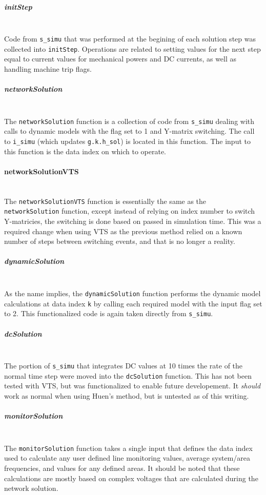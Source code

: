 \documentclass[12pt]{article}
\begin{document}
\subparagraph{initStep} \ \\
Code from \verb|s_simu| that was performed at the begining of each solution step was collected into \verb|initStep|.
Operations are related to setting values for the next step equal to current values for mechanical powers and DC currents, as well as handling machine trip flags.


\subparagraph{networkSolution} \ \\
The \verb|networkSolution| function is a collection of code from \verb|s_simu| dealing with calls to dynamic models with the flag set to 1 and Y-matrix switching.
The call to \verb|i_simu| (which updates \verb|g.k.h_sol|) is located in this function.
The input to this function is the data index on which to operate.

\paragraph{networkSolutionVTS} \ \\
The \verb|networkSolutionVTS| function is essentially the same as the \verb|networkSolution| function, except instead of relying on index number to switch Y-matricies, the switching is done based on passed in simulation time.
This was a required change when using VTS as the previous method relied on a known number of steps between switching events, and that is no longer a reality.


\subparagraph{dynamicSolution} \ \\
As the name implies, the \verb|dynamicSolution| function performs the dynamic model calculations at data index \verb|k| by calling each required model with the input flag set to 2.
This functionalized code is again taken directly from \verb|s_simu|.


\subparagraph{dcSolution} \ \\
The portion of \verb|s_simu| that integrates DC values at 10 times the rate of the normal time step were moved into the \verb|dcSolution| function.
This has not been tested with VTS, but was functionalized to enable future developement.
It \emph{should} work as normal when using Huen's method, but is untested as of this writing.

\pagebreak
\subparagraph{monitorSolution} \ \\
The \verb|monitorSolution| function takes a single input that defines the data index used to calculate any user defined line monitoring values, average system/area frequencies, and values for any defined areas.
It should be noted that these calculations are mostly based on complex voltages that are calculated during the network solution.
\end{document}
